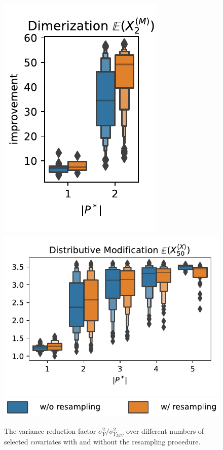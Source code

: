 \begin{figure}[htb]
  \centering
  \includegraphics[scale=.65]{gfx/dim_improvement_numcv.pdf}
  \includegraphics[scale=.65]{gfx/dm_improvement_numcv.pdf}
  \includegraphics[scale=.65]{gfx/improvement_numcv_legend.pdf}
  \caption[Number of \ac{CV} v.\ variance
  reduction]{\label{fig:cv:refinement}The variance reduction factor
    $\sigma_{Y}^2 / \sigma_{Y_{LCV}}^2$ over different numbers of
  selected covariates with and without the resampling procedure.}
\end{figure}

